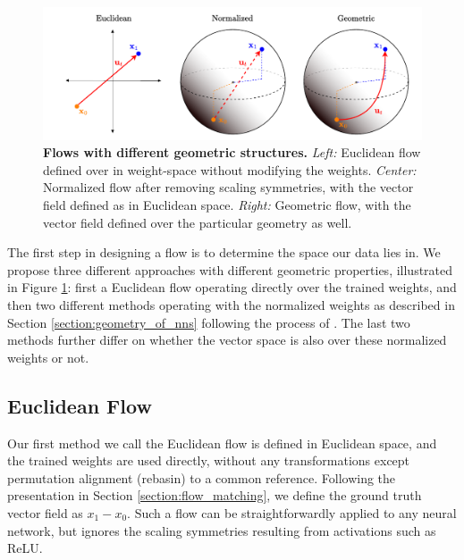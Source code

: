 \begin{figure}[h!]
    \centering
    \includegraphics[width=\textwidth]{figures/flow_types.drawio.pdf}
    \caption{\label{fig:flow_types}\textbf{Flows with different geometric structures.} \textit{Left:} Euclidean flow defined over in weight-space without modifying the weights. \textit{Center:} Normalized flow after removing scaling symmetries, with the vector field defined as in Euclidean space. \textit{Right:} Geometric flow, with the vector field defined over the particular geometry as well.}
\end{figure}

The first step in designing a flow is to determine the space our data lies in. We propose three different approaches with different geometric properties, illustrated in Figure \ref{fig:flow_types}: first a Euclidean flow operating directly over the trained weights, and then two different methods operating with the normalized weights as described in Section \ref{section:geometry_of_nns} following the process of \citep{pittorinoDeepNetworksToroids2022}. The last two methods further differ on whether the vector space is also over these normalized weights or not. 

\subsection{Euclidean Flow}

Our first method we call the Euclidean flow is defined in Euclidean space, and the trained weights are used directly, without any transformations except permutation alignment (rebasin) to a common reference. Following the presentation in Section \ref{section:flow_matching}, we define the ground truth vector field as $x_1 - x_0$. Such a flow can be straightforwardly applied to any neural network, but ignores the scaling symmetries resulting from activations such as ReLU. 

